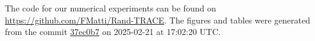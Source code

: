 The code for our numerical experiments can be found on \url{https://github.com/FMatti/Rand-TRACE}. The figures and tables were generated from the commit \href{https://github.com/FMatti/Rand-TRACE/tree/37ec0b7}{37ec0b7} on 2025-02-21 at 17:02:20 UTC.
